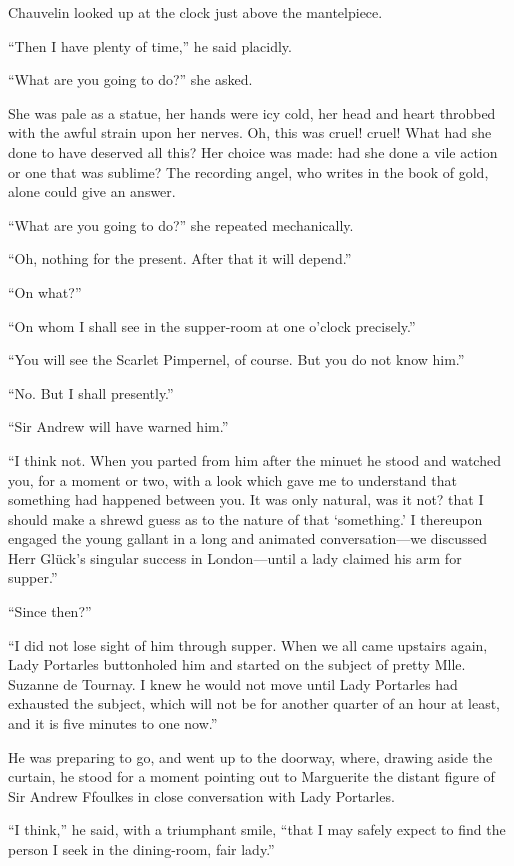 \documentclass[paper=a5,BCOR=7mm,twoside,DIV=calc,12pt,usegeometry,chapterprefix,endperiod,headings=big]{scrbook}
\begin{document}
Chauvelin looked up at the clock just above the mantelpiece.

\enquote{Then I have plenty of time,} he said placidly.

\enquote{What are you going to do?} she asked.

She was pale as a statue, her hands were icy cold, her head and heart throbbed with the awful strain upon her nerves. Oh, this was cruel! cruel! What had she done to have deserved all this? Her choice was made: had she done a vile action or one that was sublime? The recording angel, who writes in the book of gold, alone could give an answer.

\enquote{What are you going to do?} she repeated mechanically.

\enquote{Oh, nothing for the present. After that it will depend.}

\enquote{On what?}

\enquote{On whom I shall see in the supper-room at one o'clock precisely.}

\enquote{You will see the Scarlet Pimpernel, of course. But you do not know him.}

\enquote{No. But I shall presently.}

\enquote{Sir Andrew will have warned him.}

\enquote{I think not. When you parted from him after the minuet he stood and watched you, for a moment or two, with a look which gave me to understand that something had happened between you. It was only natural, was it not? that I should make a shrewd guess as to the nature of that \enquote{something.} I thereupon engaged the young gallant in a long and animated conversation---we discussed Herr Glück's singular success in London---until a lady claimed his arm for supper.}

\enquote{Since then?}

\enquote{I did not lose sight of him through supper. When we all came upstairs again, Lady Portarles buttonholed him and started on the subject of pretty Mlle. Suzanne de Tournay. I knew he would not move until Lady Portarles had exhausted the subject, which will not be for another quarter of an hour at least, and it is five minutes to one now.}

He was preparing to go, and went up to the doorway, where, drawing aside the curtain, he stood for a moment pointing out to Marguerite the distant figure of Sir Andrew Ffoulkes in close conversation with Lady Portarles.

\enquote{I think,} he said, with a triumphant smile, \enquote{that I may safely expect to find the person I seek in the dining-room, fair lady.}
\end{document}
